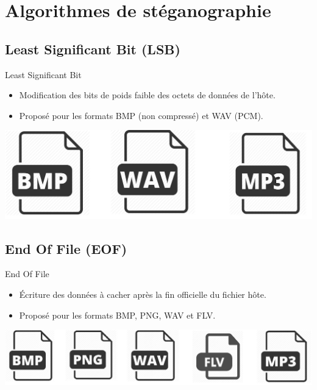 \documentclass{beamer}
\begin{document}
  \section{Algorithmes de stéganographie} %
  
	\subsection{Least Significant Bit (LSB)}
	\begin{frame}
  
	\begin{block}{Least Significant Bit}
	\begin{itemize}
	[circle]
	\item Modification des bits de poids faible des octets de données de 
	l'hôte. 
	\item Proposé pour les formats BMP (non compressé) et WAV (PCM). 
	\end{itemize}
	\end{block}
	
	\hspace{2.5cm}
    \includegraphics[scale=0.1]{pictures/lsb.png}
	\end{frame}
  
    \subsection{End Of File (EOF)}
    \begin{frame}
    
	\begin{block}{End Of File}
	\begin{itemize}
	[circle]
	\item Écriture des données à cacher après la fin officielle du fichier 
	hôte. 
	\item Proposé pour les formats BMP, PNG, WAV et FLV. 
	\end{itemize}
	\end{block}
	
	\hspace{1cm}
    \includegraphics[scale=0.2]{pictures/eof.png}
    
    \end{frame}
    
\end{document}
